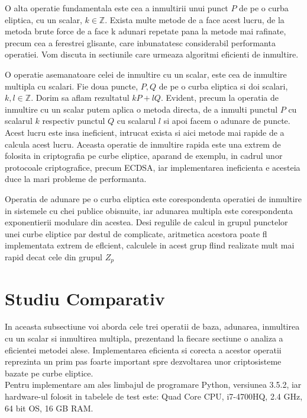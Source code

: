\begin{dfn}
O alta operatie fundamentala este cea a inmultirii unui punct $P$ de pe o curba eliptica, cu un scalar, $k\in \mathbb{Z}$. Exista multe metode de a face acest lucru, de la metoda brute force de a face k adunari repetate pana la metode mai rafinate, precum cea a ferestrei glisante, care inbunatatesc considerabil performanta operatiei. Vom discuta in sectiunile care urmeaza algoritmi eficienti de inmultire. 
\end{dfn}

\begin{dfn}
O operatie asemanatoare celei de inmultire cu un scalar, este cea de inmultire multipla cu scalari. Fie doua puncte, $P, Q$ de pe o curba eliptica si doi scalari, $k, l\in \mathbb{Z}$. Dorim sa aflam rezultatul $kP + lQ$. Evident, precum la operatia de inmultire cu un scalar putem aplica o metoda directa, de a inmulti punctul $P$ cu scalarul $k$ respectiv punctul $Q$ cu scalarul $l$ si apoi facem o adunare de puncte. Acest lucru este insa ineficient, intrucat exista si aici metode mai rapide de a calcula acest lucru. Aceasta operatie de inmultire rapida este una extrem de folosita in criptografia pe curbe eliptice, aparand de exemplu, in cadrul unor protocoale criptografice, precum ECDSA, iar implementarea ineficienta e acesteia duce la mari probleme de performanta. 
\end{dfn}

\begin{obs}
Operatia de adunare pe o curba eliptica este corespondenta operatiei de inmultire
in sistemele cu chei publice obisnuite, iar adunarea multipla este corespondenta
exponentierii modulare din acestea.
Desi regulile de calcul in grupul punctelor unei curbe eliptice par destul de complicate, aritmetica acestora poate fl implementata extrem de eflcient, calculele in acest grup flind realizate mult mai rapid decat cele din grupul $Z_p$
\end{obs}

\section{Studiu Comparativ}
\label{sec:sec03}
In aceasta subsectiune voi aborda cele trei operatii de baza, adunarea, inmultirea cu un scalar si inmultirea multipla, prezentand la fiecare sectiune o analiza a eficientei metodei alese. Implementarea eficienta si corecta a acestor operatii reprezinta un prim pas foarte important spre dezvoltarea unor criptosisteme bazate pe curbe eliptice.
\\ Pentru implementare am ales limbajul de programare Python, versiunea 3.5.2, iar hardware-ul folosit in tabelele de test este: Quad Core CPU, i7-4700HQ, 2.4 GHz, 64 bit OS, 16 GB RAM.

